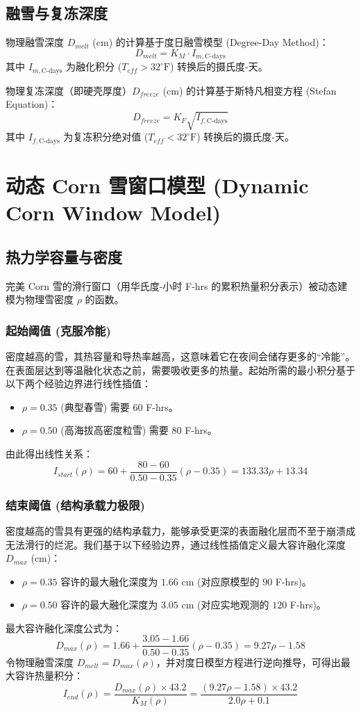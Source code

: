 \documentclass[11pt]{article}
\begin{document}
\subsection{融雪与复冻深度}
物理融雪深度 $D_{melt}$ (cm) 的计算基于度日融雪模型 (Degree-Day Method)：
\[
D_{melt} = K_M \cdot I_{m,\text{C-days}}
\]
其中 $I_{m,\text{C-days}}$ 为融化积分 ($T_{eff} > 32^\circ\text{F}$) 转换后的摄氏度-天。

物理复冻深度（即硬壳厚度）$D_{freeze}$ (cm) 的计算基于斯特凡相变方程 (Stefan Equation)：
\[
D_{freeze} = K_F \sqrt{I_{f,\text{C-days}}}
\]
其中 $I_{f,\text{C-days}}$ 为复冻积分绝对值 ($T_{eff} < 32^\circ\text{F}$) 转换后的摄氏度-天。

\section{动态 Corn 雪窗口模型 (Dynamic Corn Window Model)}
\subsection{热力学容量与密度}
完美 Corn 雪的滑行窗口（用华氏度-小时 F-hrs 的累积热量积分表示）被动态建模为物理雪密度 $\rho$ 的函数。

\subsubsection*{起始阈值 (克服冷能)}
密度越高的雪，其热容量和导热率越高，这意味着它在夜间会储存更多的“冷能”。在表面层达到等温融化状态之前，需要吸收更多的热量。起始所需的最小积分基于以下两个经验边界进行线性插值：
\begin{itemize}
    \item $\rho = 0.35$ (典型春雪) 需要 $60$ F-hrs。
    \item $\rho = 0.50$ (高海拔高密度粒雪) 需要 $80$ F-hrs。
\end{itemize}
由此得出线性关系：
\[
I_{start}(\rho) = 60 + \frac{80 - 60}{0.50 - 0.35} (\rho - 0.35) = 133.33 \rho + 13.34
\]

\subsubsection*{结束阈值 (结构承载力极限)}
密度越高的雪具有更强的结构承载力，能够承受更深的表面融化层而不至于崩溃成无法滑行的烂泥。我们基于以下经验边界，通过线性插值定义最大容许融化深度 $D_{max}$ (cm)：
\begin{itemize}
    \item $\rho = 0.35$ 容许的最大融化深度为 $1.66$ cm (对应原模型的 $90$ F-hrs)。
    \item $\rho = 0.50$ 容许的最大融化深度为 $3.05$ cm (对应实地观测的 $120$ F-hrs)。
\end{itemize}
最大容许融化深度公式为：
\[
D_{max}(\rho) = 1.66 + \frac{3.05 - 1.66}{0.50 - 0.35} (\rho - 0.35) = 9.27 \rho - 1.58
\]
令物理融雪深度 $D_{melt} = D_{max}(\rho)$，并对度日模型方程进行逆向推导，可得出最大容许热量积分：
\[
I_{end}(\rho) = \frac{D_{max}(\rho) \times 43.2}{K_M(\rho)} = \frac{(9.27 \rho - 1.58) \times 43.2}{2.0\rho + 0.1}
\]
\end{document}
